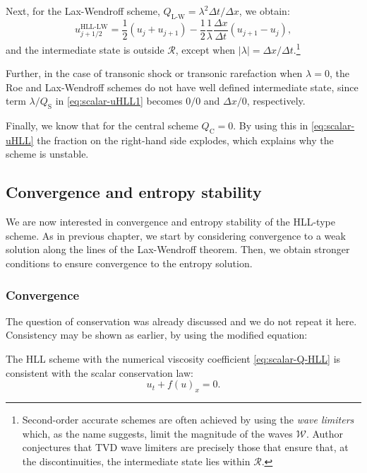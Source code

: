 Next, for the Lax-Wendroff scheme, $ Q_\text{L-W} = \lambda^2 \Delta t / \Delta x $, we obtain:
\begin{equation} 
u_{j+1/2}^\text{HLL-LW} = \frac{1}{2} \left( u_{j} + u_{j+1} \right) - \frac{1}{2} \frac{1}{\lambda} \frac{\Delta x}{\Delta t} \left( u_{j+1} - u_j \right),
\end{equation}
and the intermediate state is outside $ \mathcal{R} $, except when $ |\lambda|=\Delta x / \Delta t $.\footnote{Second-order accurate schemes are often achieved by using the \textit{wave limiters} which, as the name suggests, limit the magnitude of the waves $ \mathcal{W} $. Author conjectures that TVD wave limiters are precisely those that ensure that, at the discontinuities, the intermediate state lies within $ \mathcal{R} $.}

Further, in the case of transonic shock or transonic rarefaction when $ \lambda = 0 $, the Roe and Lax-Wendroff schemes do not have well defined intermediate state, since term $ \lambda/Q_\text{S} $ in \eqref{eq:scalar-uHLL1} becomes $ 0/0 $ and $ \Delta x /0 $, respectively.

Finally, we know that for the central scheme $ Q_\text{C} = 0 $. By using this in \eqref{eq:scalar-uHLL} the fraction on the right-hand side explodes, which explains why the scheme is unstable.

\subsection{Convergence and entropy stability}

We are now interested in convergence and entropy stability of the HLL-type scheme. As in previous chapter, we start by considering convergence to a weak solution along the lines of the Lax-Wendroff theorem. Then, we obtain stronger conditions to ensure convergence to the entropy solution.

\subsubsection*{Convergence}
The question of conservation was already discussed and we do not repeat it here. Consistency may be shown as earlier, by using the modified equation:
\begin{lemma} \label{lemma:HLL-consistent}
The HLL scheme with the numerical viscosity coefficient \eqref{eq:scalar-Q-HLL} is consistent with the scalar conservation law:
\begin{equation} \label{eq:SCL3}
u_t + f(u)_x = 0.
\end{equation}
\end{lemma}

